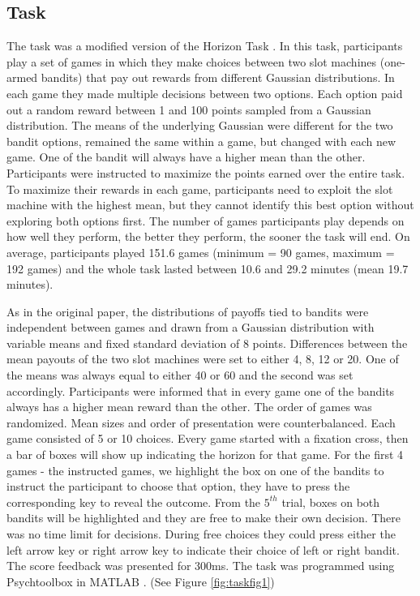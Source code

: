 \documentclass[12pt]{article}
\begin{document}
	\subsection*{Task}
	The task was a modified version of the Horizon Task \citep{wilson2014}. In this task, participants play a set of games in which they make choices between two slot machines (one-armed bandits) that pay out rewards from different Gaussian distributions. In each game they made multiple decisions between two options. Each option paid out a random reward between 1 and 100 points sampled from a Gaussian distribution. The means of the underlying Gaussian were different for the two bandit options, remained the same within a game, but changed with each new game. One of the bandit will always have a higher mean than the other. Participants were instructed to maximize the points earned over the entire task. To maximize their rewards in each game, participants need to exploit the slot machine with the highest mean, but they cannot identify this best option without exploring both options first. The number of games participants play depends on how well they perform, the better they perform, the sooner the task will end. On average, participants played 151.6 games (minimum = 90 games, maximum = 192 games) and the whole task lasted between 10.6 and 29.2 minutes (mean 19.7 minutes). %
	
	As in the original paper, the distributions of payoffs tied to bandits were independent between games and drawn from a Gaussian distribution with variable means and fixed standard deviation of 8 points. Differences between the mean payouts of the two slot machines were set to either 4, 8, 12 or 20. One of the means was always equal to either 40 or 60 and the second was set accordingly. Participants were informed that in every game one of the bandits always has a higher mean reward than the other. The order of games was randomized. Mean sizes and order of presentation were counterbalanced. Each game consisted of 5 or 10 choices. Every game started with a fixation cross, then a bar of boxes will show up indicating the horizon for that game. For the first 4 games - the instructed games, we highlight the box on one of the bandits to instruct the participant to choose that option, they have to press the corresponding key to reveal the outcome. From the $5^{th}$ trial, boxes on both bandits will be highlighted and they are free to make their own decision. There was no time limit for decisions. During free choices they could press either the left arrow key or right arrow key to indicate their choice of left or right bandit. The score feedback was presented for 300ms. The task was programmed using Psychtoolbox in MATLAB \citep{psychtoolbox1, psychtoolbox2}. (See Figure \ref{fig:taskfig1})
	
\end{document}
